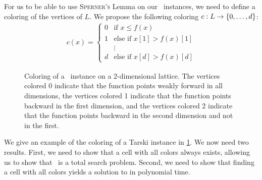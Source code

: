 For us to be able to use \textsc{Sperner's} Lemma on our \Tarskistar\ instances, we need to define a coloring of the vertices of $L$. We propose the following coloring $c : L \rightarrow \left\{0, \dots, d\right\}$:
\begin{align*}
	c(x) =
	\begin{cases}
		0 & \text{if $x \leq f(x)$}         \\
		1 & \text{else if $x[1] > f(x)[1]$} \\
		  & \vdots                          \\
		d & \text{else if $x[d] > f(x)[d]$}
	\end{cases}
\end{align*}

\begin{figure}[ht]
	\centering
	\caption[Coloring of a \Tarskistar instance]{Coloring of a \Tarskistar\ instance on a 2-dimensional lattice. The vertices colored 0 indicate that the function points weakly forward in all dimensions, the vertices colored 1 indicate that the function points backward in the first dimension, and the vertices colored 2 indicate that the function points backward in the second dimension and not in the first.}
	\label{fig:tarskistar_coloring}
\end{figure}

We give an example of the coloring of a Tarski instance in \cref{fig:tarskistar_coloring}. We now need two results. First, we need to show that a cell with all colors always exists, allowing us to show that \Tarskistar\ is a total search problem. Second, we need to show that finding a cell with all colors yields a solution to \Tarskistar in polynomial time.


